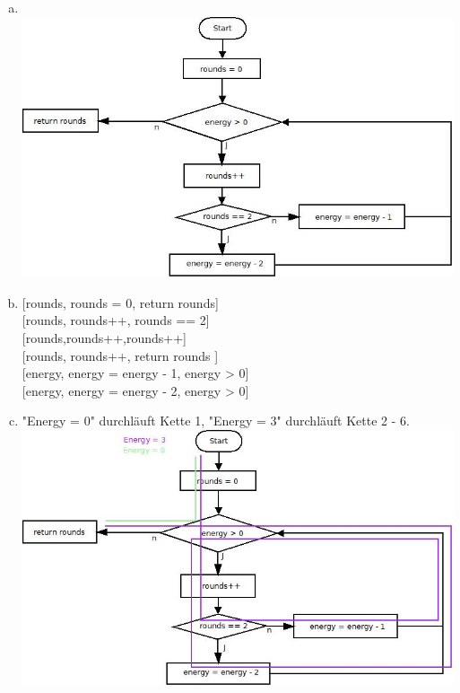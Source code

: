 \begin{enumerate} [a)]
	\item\phantom{}\\ \includegraphics[width=\textwidth, height=\textheight, keepaspectratio]{Aufgabe 20.jpeg}
	\item \phantom{} [rounds, rounds = 0, return rounds] \\
		\phantom{}	[rounds, rounds++, rounds == 2] \\
		\phantom{}[rounds,rounds++,rounds++] \\
\phantom{}	[rounds, rounds++, return rounds ]\\
\phantom{}	[energy, energy = energy - 1, energy > 0] \\
\phantom{}	[energy, energy = energy - 2, energy > 0] \\
\pagebreak
\item  "\phantom{}Energy = 0"\phantom{} durchläuft Kette 1, "\phantom{}Energy = 3"\phantom{} durchläuft Kette 2 - 6.\\  \includegraphics[width=\textwidth, height=\textheight, keepaspectratio]{Aufgabe 20 DU.jpeg}
\end{enumerate}
